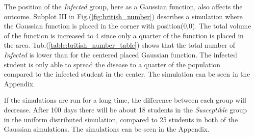 \documentclass[%
twoside,                 %
final,                   %
10pt]{article}
\begin{document}
\vspace{3mm}




\vspace{3mm}


The position of the \emph{Infected} group, here as a Gaussian function, also affects the outcome. Subplot III in Fig.(\ref{fig:british_number}) describes a simulation where the Gaussian function is placed in the corner with position(0,0). The total volume of the function is increased to 4 since only a quarter of the function is placed in the area. Tab.(\ref{table:british_number_table}) shows that the total number of \emph{Infected} is lower than for the centered placed Gaussian function. The infected student is only able to spread the disease to a quarter of the population compared to the infected student in the center. The simulation can be seen in the Appendix.


\vspace{3mm}




\vspace{3mm}


If the simulations are run for a long time, the difference between each group will decrease. After 100 days there will be about 18 students in the \emph{Susceptible} group in the uniform distributed simulation, compared to 25 students in both of the Gaussian simulations. The simulations can be seen in the Appendix.

\end{document}
